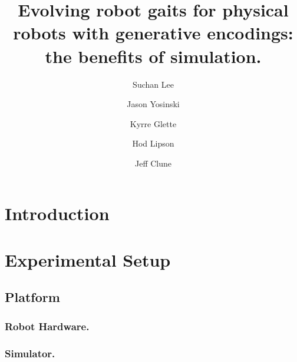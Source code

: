 \documentclass{llncs}
\begin{document}
%
\title{Evolving robot gaits for physical robots with generative encodings: the benefits of simulation.}

\author{Suchan Lee \and Jason Yosinski \and Kyrre Glette \and Hod Lipson \and Jeff Clune }
\maketitle
%
%
%
%
\begin{abstract}

\end{abstract}
%
%


\section{Introduction}

%
%
\section{Experimental Setup}
\subsection{Platform}
\subsubsection{Robot Hardware.}

\subsubsection{Simulator.}

\end{document}
